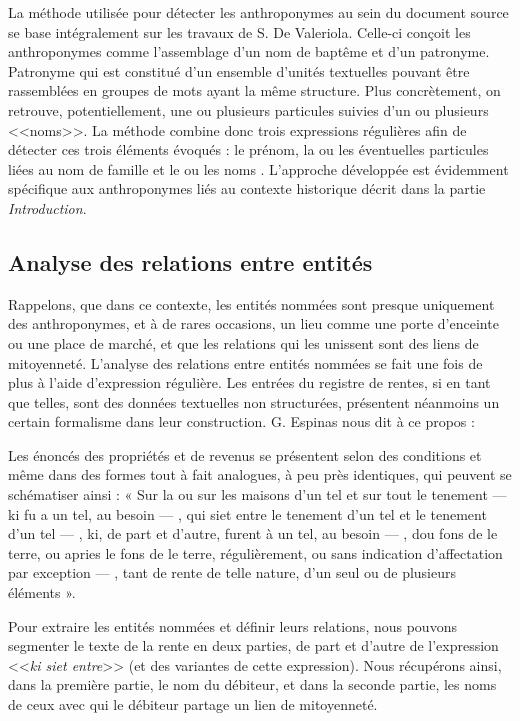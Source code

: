 La méthode utilisée pour détecter les anthroponymes au sein du document source se base intégralement sur les travaux de S. De Valeriola. Celle-ci conçoit les anthroponymes comme l'assemblage d'un nom de baptême et d'un patronyme. Patronyme qui est constitué d'un ensemble d'unités textuelles  pouvant être rassemblées en  groupes de mots ayant la même structure. Plus concrètement, on retrouve, potentiellement,  une ou plusieurs particules  suivies d'un ou plusieurs <<noms>>. La méthode combine donc trois expressions régulières afin de détecter ces trois éléments évoqués : le prénom, la ou les éventuelles particules liées au nom de famille et le ou les noms \parencite{de_valeriola_lordinateur_2021}. L'approche développée est évidemment spécifique aux anthroponymes liés au contexte historique décrit dans la partie \textit{Introduction}.

\subsection{Analyse des relations entre entités}
Rappelons, que dans ce contexte, les entités nommées sont presque uniquement des anthroponymes, et à de rares occasions, un lieu comme une porte d'enceinte ou une place de marché, et que les relations qui les unissent sont des liens de mitoyenneté.
L'analyse des relations entre entités nommées se fait une fois de plus à l'aide d'expression régulière. Les entrées du registre de rentes, si en tant que telles, sont des données textuelles non structurées, présentent néanmoins un certain formalisme dans leur construction. G. Espinas nous dit à ce propos : 
\begin{displayquote}
    \og Les énoncés des propriétés et de revenus se présentent selon des conditions et même dans des formes tout à fait analogues, à peu près identiques, qui peuvent se schématiser ainsi : « Sur la ou sur les maisons d’un tel et sur tout le tenement — ki fu a un tel, au besoin — , qui siet entre le tenement d’un tel et le tenement d’un tel — , ki, de part et d’autre, furent à un tel, au besoin — , dou fons de le terre, ou apries le fons de le terre, régulièrement, ou sans indication d’affectation par exception — , tant de rente de telle nature, d’un seul ou de plusieurs éléments ».\fg{}
\end{displayquote} 
\vspace{0,5cm}
Pour extraire les entités nommées et définir leurs relations, nous pouvons segmenter le texte de la rente en deux parties, de part et d'autre de l'expression <<\textit{ki siet entre}>> (et des variantes de cette expression). Nous récupérons ainsi, dans la première partie, le nom du débiteur, et dans la seconde partie, les noms de ceux avec qui le débiteur partage un lien de mitoyenneté.




